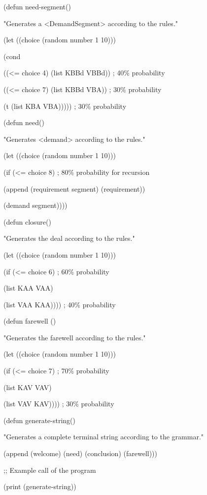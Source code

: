 \documentclass[
]{article}
\begin{document}
(defun need-segment()

"Generates a \textless DemandSegment\textgreater{} according to the
rules."

(let ((choice (random number 1 10)))

(cond

((\textless= choice 4) (list \textquotesingle KBBd
\textquotesingle VBBd)) ; 40\% probability

((\textless= choice 7) (list \textquotesingle KBBd
\textquotesingle VBA)) ; 30\% probability

(t (list \textquotesingle KBA \textquotesingle VBA))))) ; 30\%
probability

(defun need()

"Generates \textless demand\textgreater{} according to the rules."

(let ((choice (random number 1 10)))

(if (\textless= choice 8) ; 80\% probability for recursion

(append (requirement segment) (requirement))

(demand segment))))

(defun closure()

"Generates the deal according to the rules."

(let ((choice (random number 1 10)))

(if (\textless= choice 6) ; 60\% probability

(list \textquotesingle KAA \textquotesingle VAA)

(list \textquotesingle VAA \textquotesingle KAA)))) ; 40\% probability

(defun farewell ()

"Generates the farewell according to the rules."

(let ((choice (random number 1 10)))

(if (\textless= choice 7) ; 70\% probability

(list \textquotesingle KAV\textquotesingle{} VAV)

(list \textquotesingle VAV \textquotesingle KAV)))) ; 30\% probability

(defun generate-string()

"Generates a complete terminal string according to the grammar."

(append (welcome) (need) (conclusion) (farewell)))

;; Example call of the program

(print (generate-string))
\end{document}
